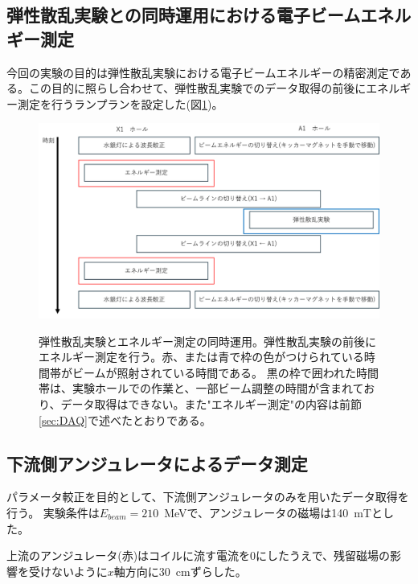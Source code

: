\documentclass[a4paper,11pt,uplatex]{jsbook}
\begin{document}
\subsection{弾性散乱実験との同時運用における電子ビームエネルギー測定}
今回の実験の目的は弾性散乱実験における電子ビームエネルギーの精密測定である。この目的に照らし合わせて、弾性散乱実験でのデータ取得の前後にエネルギー測定を行うランプランを設定した(図\ref{beamtime})。
\begin{figure}
  \centering
  \includegraphics[width=\linewidth]{image/3-beamtime.png}\\
  \caption[弾性散乱実験とエネルギー測定の同時運用]{弾性散乱実験とエネルギー測定の同時運用。弾性散乱実験の前後にエネルギー測定を行う。赤、または青で枠の色がつけられている時間帯がビームが照射されている時間である。
  黒の枠で囲われた時間帯は、実験ホールでの作業と、一部ビーム調整の時間が含まれており、データ取得はできない。また"エネルギー測定"の内容は前節\ref{sec:DAQ}で述べたとおりである。}
  \label{beamtime}
\end{figure}
\subsection{下流側アンジュレータによるデータ測定}
パラメータ較正を目的として、下流側アンジュレータのみを用いたデータ取得を行う。
実験条件は$E_{beam} = 210$~MeVで、アンジュレータの磁場は140~mTとした。

上流のアンジュレータ(赤)はコイルに流す電流を0にしたうえで、残留磁場の影響を受けないように$x$軸方向に30~cmずらした。
\end{document}
